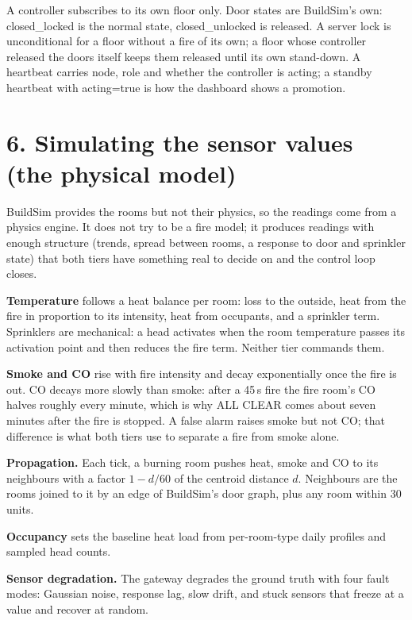 \documentclass[11pt]{article}
\begin{document}
A controller subscribes to its own floor only. Door states are BuildSim's own: 
closed\_locked is the normal state, closed\_unlocked is released. A server lock is 
unconditional for a floor without a fire of its own; a floor whose controller released the 
doors itself keeps them released until its own stand-down. A heartbeat carries node, 
role and whether the controller is acting; a standby heartbeat with acting=true is 
how the dashboard shows a promotion.


\section{6. Simulating the sensor values (the physical model)}

BuildSim provides the rooms but not their physics, so the readings come from a physics engine. It does 
not try to be a fire model; it produces readings with enough structure (trends, spread between rooms, 
a response to door and sprinkler state) that both tiers have something real to decide on and 
the control loop closes.

\textbf{Temperature} follows a heat balance per room: loss to the outside, heat from the fire in 
proportion to its intensity, heat from occupants, and a sprinkler term. Sprinklers are mechanical: 
a head activates when the room temperature passes its activation point and then reduces the fire 
term. Neither tier commands them.

\textbf{Smoke and CO} rise with fire intensity and decay exponentially once the fire is out. CO 
decays more slowly than smoke: after a 45\,s fire the fire room's CO halves roughly every minute, 
which is why ALL CLEAR comes about seven minutes after the fire is stopped. A false alarm raises 
smoke but not CO; that difference is what both tiers use to separate a fire from smoke alone.

\textbf{Propagation.} Each tick, a burning room pushes heat, smoke and CO to its neighbours with 
a factor $1 - d/60$ of the centroid distance $d$. Neighbours are the rooms joined to it by an edge 
of BuildSim's door graph, plus any room within 30 units.

\textbf{Occupancy} sets the baseline heat load from per-room-type daily profiles and sampled 
head counts.

\textbf{Sensor degradation.} The gateway degrades the ground truth with four fault modes: 
Gaussian noise, response lag, slow drift, and stuck sensors that freeze at a value and recover 
at random.
\end{document}

